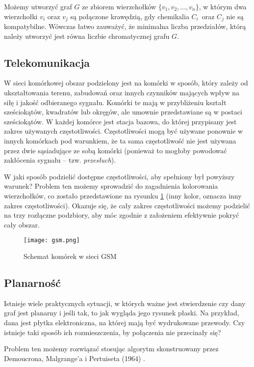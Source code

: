 Możemy utworzyć graf $G$ ze zbiorem wierzchołków $\{v_1,v_2,\ldots,v_n\}$, w którym dwa wierzchołki $v_i$ oraz $v_j$ są połączone krawędzią, gdy chemikalia $C_i$~oraz $C_j$ nie są kompatybilne. Wówczas łatwo zauważyć, że minimalna liczba przedziałów, którą należy utworzyć jest równa liczbie chromatycznej grafu $G$. 


\subsection*{Telekomunikacja}

W sieci komórkowej obszar podzielony jest na komórki w sposób, który zależy od  ukształtowania terenu, zabudowań oraz innych czynników mających wpływ na siłę i jakość odbieranego sygnału. Komórki te mają w przybliżeniu kształt sześciokątów, kwadratów lub okręgów, ale umownie przedstawiane są w postaci sześciokątów. W każdej komórce jest stacja bazowa, do której przypisany jest zakres używanych częstotliwości. Częstotliwości mogą być używane ponownie w innych komórkach pod warunkiem, że ta sama częstotliwość nie jest używana przez dwie sąsiadujące ze sobą komórki (ponieważ to mogłoby powodować zakłócenia sygnału -- tzw. \emph{przesłuch}).

W jaki sposób podzielić dostępne częstotliwości, aby spełniony był powyższy warunek? Problem ten możemy sprowadzić do zagadnienia kolorowania wierzchołków, co zostało przedstawione na rysunku \ref{fig:gsm} (inny kolor, oznacza inny zakres częstotliwości). Okazuje się, że cały zakres częstotliwości możemy podzielić na trzy rozłączne podzbiory, aby móc zgodnie z założeniem efektywnie pokryć cały obszar. 

\begin{figure}[H]
\caption{Schemat komórek w sieci GSM \cite{dharwadker}}\label{fig:gsm}
\centering
\texttt{[image: gsm.png]}
\end{figure}


\subsection*{Planarność}

Istnieje wiele praktycznych sytuacji, w których ważne jest stwierdzenie czy dany graf jest planarny i jeśli tak, to jak wygląda jego rysunek płaski. Na przykład, dana jest płytka elektroniczna, na której mają być wydrukowane przewody. Czy istnieje taki sposób ich rozmieszczenia, by połączenia nie przecinały się?

Problem ten możemy rozwiązać stosując algorytm skonstruowany przez Demoucrona, Malgrange'a i Pertuiseta (1964) \cite[163]{bondy}.


